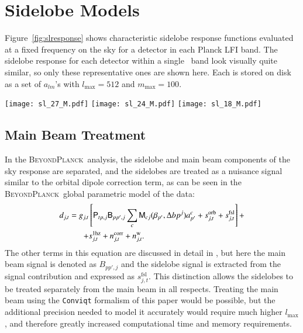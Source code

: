 \documentclass[twocolumn]{aa}
\newcommand{\B}[0]{\tens{B}}
\newcommand{\M}[0]{\tens{M}}
\renewcommand{\P}[0]{\tens{P}}
\newcommand{\BP}{\textsc{BeyondPlanck}}
\begin{document}
\section{Sidelobe Models}

Figure~\ref{fig:slresponse} shows characteristic sidelobe response functions evaluated at a fixed frequency on the sky for a detector in each Planck LFI band. The sidelobe response for each detector within a single \Planck\ band look visually quite similar, so only these representative ones are shown here. Each is stored on disk as a set of $a_{lm}$'s with $l_\mathrm{max} = 512$ and $m_\mathrm{max} = 100$. 

\begin{figure*}[t]
  \center
  \texttt{[image: sl\_27\_M.pdf]}
  \texttt{[image: sl\_24\_M.pdf]}
  \texttt{[image: sl\_18\_M.pdf]}\\
  \caption{Maps of the sidelobe response on the sky from a representative detector at (left to right) 30\,GHz, 44\,GHz and 70\,GHz. The beam orientation is such that the main beam is pointed directly at the north pole in these maps. The intensities are normalized such that the main beams have unit power at $l=0$.
  }\label{fig:slresponse}
\end{figure*}

\subsection{Main Beam Treatment}

In the \BP\ analysis, the sidelobe and main beam components of the sky response are separated, and the sidelobes are treated as a nuisance signal similar to the orbital dipole correction term, as can be seen in the \BP\ global parametric model of the data:
\begin{equation}
\begin{split}
d_{j,t} = g_{j,t}&\left[\P_{tp,j}\B_{pp',j}\sum_{c}
\M_{cj}(\beta_{p'}, \Delta bp^{j})a^c_{p'}  + s^{\mathrm{orb}}_{j,t}  
+ s^{\mathrm{fsl}}_{j,t}\right] + \\
+ &s^{\mathrm{1hz}}_{j,t} + n^{\mathrm{corr}}_{j,t} + n^{\mathrm{w}}_{j,t}.
\end{split}
\label{eq:datamodel}
\end{equation}
The other terms in this equation are discussed in detail in \cite{BP01}, but here the main beam signal is denoted as $B_{pp',j}$ and the sidelobe signal is extracted from the signal contribution and expressed as $s^{\mathrm{fsl}}_{j,t}$. This distinction allows the sidelobes to be treated separately from the main beam in all respects. Treating the main beam using the \texttt{Conviqt} formalism of this paper would be possible, but the additional precision needed to model it accurately would require much higher $l_\mathrm{max}$, and therefore greatly increased computational time and memory requirements. 
\end{document}
